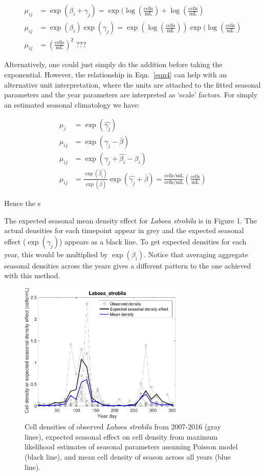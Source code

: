 \documentclass[11pt]{article}
\begin{document}
\begin{align}
\mu_{ij} &= \exp(\beta_i +\gamma_j) = \exp( \log (\frac{\text{cells}}{\text{mL}}) + \log(\frac{\text{cells}}{\text{mL}}) \\
\mu_{ij} &= \exp(\beta_i)\exp(\gamma_j) = \exp(\log(\frac{\text{cells}}{\text{mL}}))\exp(\log(\frac{\text{cells}}{\text{mL}}) \\
\mu_{ij} &= \left( \frac{\text{cells}}{\text{mL}}\right)^{2} \text{  ???}
\end{align}

Alternatively, one could just simply do the addition before taking the exponential. However, the relationship in Eqn.~\ref{eqn4} can help with an alternative unit interpretation, where the units are attached to the fitted seasonal parameters and the year parameters are interpreted as `scale' factors. For simply an estimated seasonal climatology we have:

\begin{align}
\mu_{j} &= \exp(\hat{\gamma_j}) \\
\mu_{ij} & = \exp\left(\gamma_j - \bar{\beta} \right) \\
\mu_{ij} & = \exp(\gamma_j + \hat{\beta_i} - \beta_i) \\
\mu_{ij} & = \frac{\exp(\hat{\beta_i})}{\exp(\bar{\beta})}\exp(\hat{\gamma_j} + \bar{\beta}) = \frac{\text{cells/mL}}{\text{cells/mL}} \left(\frac{\text{cells}}{\text{mL}}\right)
\end{align}

Hence the s

The expected seasonal mean density effect for \textit{Laboea strobila} is in Figure 1. The actual densities for each timepoint appear in grey and the expected seasonal effect ($\exp(\gamma_j)$) appears as a black line. To get expected densities for each year, this would be multiplied by $\exp(\beta_i)$. Notice that averaging aggregate seasonal densities across the years gives a different pattern to the one achieved with this method.

\begin{figure}[h]
\centering
\includegraphics[width=0.7\textwidth]{Laboea_summary.pdf}
\caption{Cell densities of observed \textit{Laboea strobila} from 2007-2016 (gray lines), expected seasonal effect on cell density from maximum likelihood estimates of seasonal parameters assuming Poisson model (black line), and mean cell density of season across all years (blue line).}
\end{figure}
\end{document}
